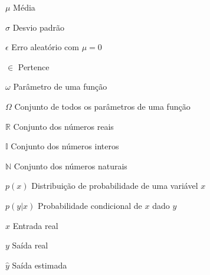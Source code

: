 


\begin{simbolos}
	\item[$\mu$] Média
	\item[$\sigma$] Desvio padrão
	\item[$ \epsilon $] Erro aleatório com $\mu = 0$
	\item[$ \in $] Pertence
	\item[$ \omega $] Parâmetro de uma função
	\item[$ \Omega $] Conjunto de todos os parâmetros de uma função
	\item[$\mathbb {R}$] Conjunto dos números reais
	\item[$\mathbb {I}$] Conjunto dos números interos
	\item[$\mathbb {N}$] Conjunto dos números naturais
	\item[$p(x)$] Distribuição de probabilidade de uma variável $x$
	\item[$p(y | x)$] Probabilidade condicional de $x$ dado $y$
	\item[$x$] Entrada real
	\item[$y$] Saída real
	\item[$\hat{y}$] Saída estimada


\end{simbolos}




